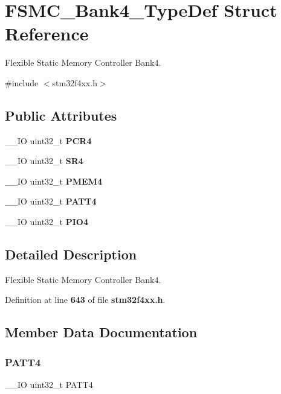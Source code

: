\section{F\+S\+M\+C\+\_\+\+Bank4\+\_\+\+Type\+Def Struct Reference}
\label{structFSMC__Bank4__TypeDef}


Flexible Static Memory Controller Bank4.  




{\ttfamily \#include $<$stm32f4xx.\+h$>$}

\subsection*{Public Attributes}
\begin{DoxyCompactItemize}
\item 
\+\_\+\+\_\+\+IO uint32\+\_\+t \textbf{ P\+C\+R4}
\item 
\+\_\+\+\_\+\+IO uint32\+\_\+t \textbf{ S\+R4}
\item 
\+\_\+\+\_\+\+IO uint32\+\_\+t \textbf{ P\+M\+E\+M4}
\item 
\+\_\+\+\_\+\+IO uint32\+\_\+t \textbf{ P\+A\+T\+T4}
\item 
\+\_\+\+\_\+\+IO uint32\+\_\+t \textbf{ P\+I\+O4}
\end{DoxyCompactItemize}


\subsection{Detailed Description}
Flexible Static Memory Controller Bank4. 

Definition at line \textbf{ 643} of file \textbf{ stm32f4xx.\+h}.



\subsection{Member Data Documentation}
\mbox{\label{structFSMC__Bank4__TypeDef_a955cad1aab7fb2d5b6e216cb29b5e7e2}} 
\subsubsection{P\+A\+T\+T4}
{\footnotesize\ttfamily \+\_\+\+\_\+\+IO uint32\+\_\+t P\+A\+T\+T4}

